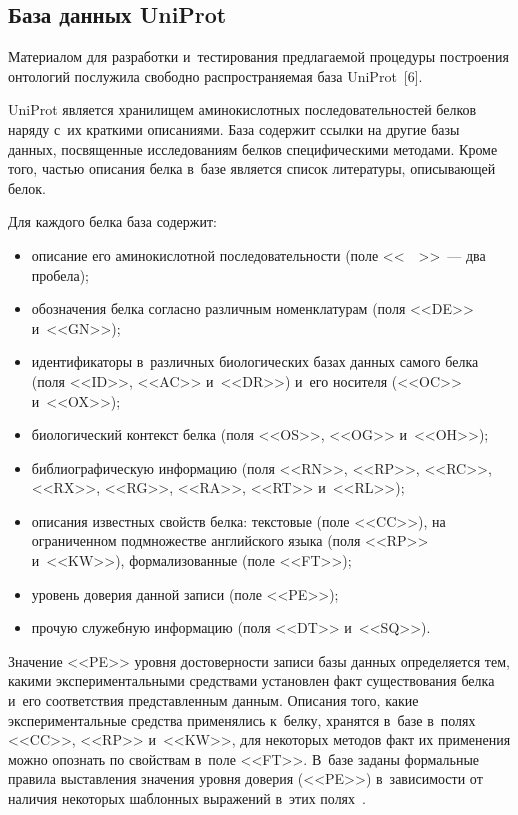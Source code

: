 \begin{multicols}{2}
  
  \subsection{База данных UniProt}
  
  Материалом для разработки и~тестирования предлагаемой процедуры 
построения онтологий послужила свободно распространяемая база UniProt~[6].
  
  UniProt является хранилищем аминокислотных последовательностей белков 
наряду с~их краткими описаниями. База содержит ссылки на другие базы 
данных, посвященные исследованиям белков специфическими методами. 
Кроме того, частью описания белка в~базе является список литературы, 
описывающей белок.
  
  Для каждого белка база содержит:
  \begin{itemize}
\item описание его аминокислотной последовательности (поле <<\ \ >>~--- два 
пробела);
\item обозначения белка согласно различным номенклатурам (поля <<DE>> 
и~<<GN>>);
\item идентификаторы в~различных биологических базах данных самого белка 
(поля <<ID>>, <<AC>> и~<<DR>>) и~его носителя (<<OC>> и~<<OX>>);
\item биологический контекст белка (поля <<OS>>, <<OG>> и~<<OH>>);
\item библиографическую информацию (поля <<RN>>, <<RP>>, <<RC>>, 
<<RX>>, <<RG>>, <<RA>>, <<RT>> и~<<RL>>);
\item описания известных свойств белка: текстовые (поле <<CC>>), на 
ограниченном подмножестве английского языка (поля <<RP>> и~<<KW>>), 
формализованные (поле <<FT>>);
\item уровень доверия данной записи (поле <<PE>>);
\item прочую служебную информацию (поля <<DT>> и~<<SQ>>).
\end{itemize}

  Значение <<PE>> уровня достоверности записи базы данных определяется 
тем, какими экспериментальными средствами установлен факт существования 
белка и~его соответствия представленным данным. Описания того, какие 
экспериментальные средства применялись к~белку, хранятся в~базе в~полях 
<<CC>>, <<RP>> и~<<KW>>, для некоторых методов факт их применения 
можно опознать по свойствам в~поле <<FT>>. В~базе заданы формальные 
правила выставления значения уровня доверия (<<PE>>) в~зависимости от 
наличия некоторых шаблонных выражений в~этих полях~\cite{12-al}.




\end{multicols}
